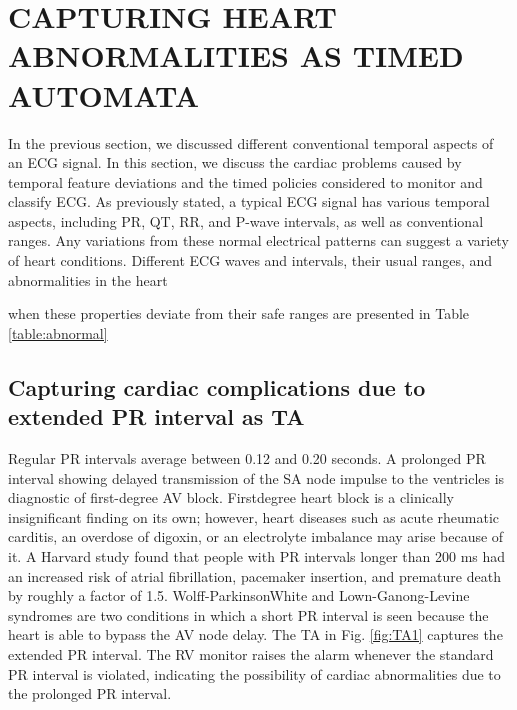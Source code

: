 

\section{CAPTURING HEART ABNORMALITIES AS TIMED AUTOMATA}

In the previous section, we discussed different conventional temporal
aspects of an ECG signal. In this section, we discuss the cardiac problems caused by temporal feature deviations and the timed policies
considered to monitor and classify ECG.
As previously stated, a typical ECG signal has various temporal
aspects, including PR, QT, RR, and P-wave intervals, as well as
conventional ranges. Any variations from these normal electrical
patterns can suggest a variety of heart conditions. Different ECG
waves and intervals, their usual ranges, and abnormalities in the heart

when these properties deviate from their safe ranges are presented in
Table \ref{table:abnormal}

\subsection{Capturing cardiac complications due to
	extended PR interval as TA}
	
Regular PR intervals average between 0.12 and 0.20 seconds. A
prolonged PR interval showing delayed transmission of the SA node
impulse to the ventricles is diagnostic of first-degree AV block. Firstdegree heart block is a clinically insignificant finding on its own;
however, heart diseases such as acute rheumatic carditis, an overdose
of digoxin, or an electrolyte imbalance may arise because of it. A
Harvard study found that people with PR intervals longer than 200
ms had an increased risk of atrial fibrillation, pacemaker insertion,
and premature death by roughly a factor of 1.5. Wolff-ParkinsonWhite and Lown-Ganong-Levine syndromes are two conditions in
which a short PR interval is seen because the heart is able to bypass
the AV node delay. The TA in Fig. \ref{fig:TA1} captures the extended PR
interval. The RV monitor raises the alarm whenever the standard PR
interval is violated, indicating the possibility of cardiac abnormalities
due to the prolonged PR interval.



